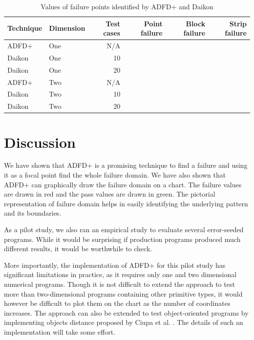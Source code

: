 \begin{table}[ht]
\caption{Values of failure points identified by ADFD+ and Daikon}
\bigskip
\centering
{\renewcommand{\arraystretch}{1.3}
\begin{tabular}{|l|l|r|r|r|r|}
\hline
Technique 	& Dimension	& Test cases		& 	Point failure		& 	Block failure	& 	Strip failure	\\
\hline
ADFD+		& 	One				& N/A			& 					& 				&				\\
Daikon		& 	One				& 10			&					&				&				\\
Daikon		& 	One				& 20			&					&				&				\\
ADFD+		& 	Two				& N/A			&					&				&				\\
Daikon		& 	Two				& 10			&					&				&				\\
Daikon		& 	Two				& 20			&					&				&				\\
\hline
\end{tabular}
}
\bigskip
\label{table:ADFD+Results_6}
\end{table}










\section{Discussion}\label{sec:intro6_13}
We have shown that ADFD+ is a promising technique to find a failure and using it as a focal point find the whole failure domain. We have also shown that ADFD+ can graphically draw the failure domain on a chart. The failure values are drawn in red and the pass values are drawn in green. The pictorial representation of failure domain helps in easily identifying the underlying pattern and its boundaries.

As a pilot study, we also ran an empirical study to evaluate several error-seeded programs. While it would be surprising if production programs produced much different results, it would be worthwhile to check.

More importantly, the implementation of ADFD+ for this pilot study has significant limitations in practice, as it requires only one and two dimensional numerical programs. Though it is not difficult to extend the approach to test more than two-dimensional programs containing other primitive types, it would however be difficult to plot them on the chart as the number of coordinates increases. The approach can also be extended to test object-oriented programs by implementing objects distance proposed by Ciupa et al. \cite{ciupa2006object}. The details of such an implementation will take some effort.

